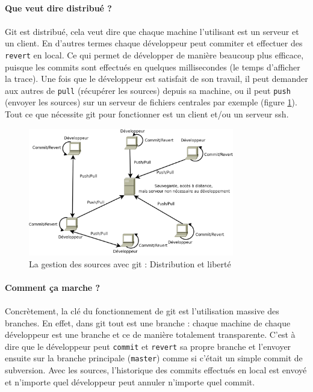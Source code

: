 \paragraph{Que veut dire distribué ?} 
\paragraph{}Git est distribué, cela veut dire que chaque machine l'utilisant est un serveur et un client. En d'autres termes chaque développeur peut commiter et effectuer des \verb|revert| en local. Ce qui permet de développer de manière beaucoup plus efficace, puisque les commits sont effectués en quelques millisecondes (le temps d'afficher la trace). Une fois que le développeur est satisfait de son travail, il peut demander aux autres de \verb|pull| (récupérer les sources) depuis sa machine, ou il peut \verb|push| (envoyer les sources) sur un serveur de fichiers centrales par exemple (figure \ref{git}). Tout ce que nécessite git pour fonctionner est un client et/ou un serveur ssh.


\begin{figure}[H]
\begin{center}
        \includegraphics[width=0.8\textwidth]{../images/git.png}
\caption{La gestion des sources avec git : Distribution et liberté}
\label{git}
\end{center}
\end{figure}




\paragraph{Comment ça marche ?} 
\paragraph{}Concrètement, la clé du fonctionnement de git est l'utilisation massive des branches. En effet, dans git tout est une branche : chaque machine de chaque développeur est une branche et ce de manière totalement transparente. C'est à dire que le développeur peut \verb|commit| et \verb|revert| sa propre branche et l'envoyer ensuite sur la branche principale (\verb|master|) comme si c'était un simple commit de subversion. Avec les sources, l'historique des commits effectués en local est envoyé et n'importe quel développeur peut annuler n'importe quel commit. 


